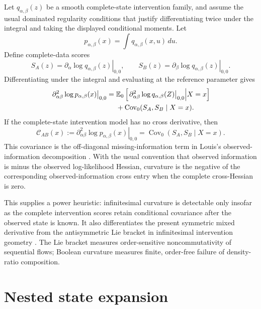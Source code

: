 \documentclass[11pt]{article}
\newcommand{\E}{\mathbb{E}}
\newcommand{\Cov}{\operatorname{Cov}}
\begin{document}
Let \(q_{\alpha,\beta}(z)\) be a smooth complete-state intervention family, and assume the usual dominated regularity conditions that justify differentiating twice under the integral and taking the displayed conditional moments.  Let
\begin{equation}
p_{\alpha,\beta}(x)=\int q_{\alpha,\beta}(x,u)\,du.
\end{equation}
Define complete-data scores
\begin{equation}
S_A(z)=\left.\partial_\alpha\log q_{\alpha,\beta}(z)\right|_{0,0},
\qquad
S_B(z)=\left.\partial_\beta\log q_{\alpha,\beta}(z)\right|_{0,0}.
\end{equation}
Differentiating under the integral and evaluating at the reference parameter gives
\begin{align}
\left.\partial_{\alpha\beta}^2\log p_{\alpha,\beta}(x)\right|_{0,0}
={}&
\E_0\left[\left.\partial_{\alpha\beta}^2\log q_{\alpha,\beta}(Z)\right|_{0,0}\middle| X=x\right]
\notag\\
&+
\Cov_0(S_A,S_B\mid X=x).
\label{eq:louis-general}
\end{align}
If the complete-state intervention model has no cross derivative, then
\begin{equation}
\boxed{
\mathcal C_{AB}(x)
:=
\left.\partial_{\alpha\beta}^2\log p_{\alpha,\beta}(x)\right|_{0,0}
=
\Cov_0(S_A,S_B\mid X=x).
}
\label{eq:infinitesimal-curvature}
\end{equation}
This covariance is the off-diagonal missing-information term in Louis's observed-information decomposition \citep{louis1982missing}.  With the usual convention that observed information is minus the observed log-likelihood Hessian, curvature is the negative of the corresponding observed-information cross entry when the complete cross-Hessian is zero.

This supplies a power heuristic: infinitesimal curvature is detectable only insofar as the complete intervention scores retain conditional covariance after the observed state is known.  It also differentiates the present symmetric mixed derivative from the antisymmetric Lie bracket in infinitesimal intervention geometry \citep{mahadevan2026infinitesimal}.  The Lie bracket measures order-sensitive noncommutativity of sequential flows; Boolean curvature measures finite, order-free failure of density-ratio composition.

\section{Nested state expansion}
\end{document}
